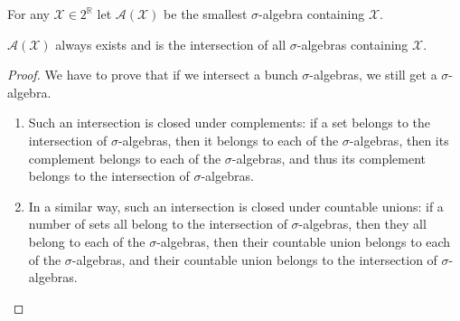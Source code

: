 \begin{definition}
    For any $\mathcal{X} \in 2^\mathbb{R}$ let $\mathcal{A}(\mathcal{X})$
    be the smallest $\sigma$-algebra containing $\mathcal{X}$.
\end{definition}

\begin{lemma}
    $\mathcal{A}(\mathcal{X})$ always exists and is the intersection of all $\sigma$-algebras
    containing $\mathcal{X}$.
\end{lemma}
\begin{proof}
    We have to prove that if we intersect a bunch $\sigma$-algebras, we still get a 
    $\sigma$-algebra.
    \begin{enumerate}
        \item {
            Such an intersection is closed under complements:
            if a set belongs to the intersection of $\sigma$-algebras,
            then it belongs to each of the $\sigma$-algebras, 
            then its complement belongs to each of the $\sigma$-algebras,
            and thus its complement belongs to the intersection of 
            $\sigma$-algebras.
        }
        \item {
            In a similar way, such an intersection is closed under countable unions:
            if a number of sets all belong to the intersection of $\sigma$-algebras,
            then they all belong to each of the $\sigma$-algebras, 
            then their countable union belongs to each of the $\sigma$-algebras,
            and their countable union belongs to the intersection of 
            $\sigma$-algebras.
        }
    \end{enumerate}
\end{proof}

